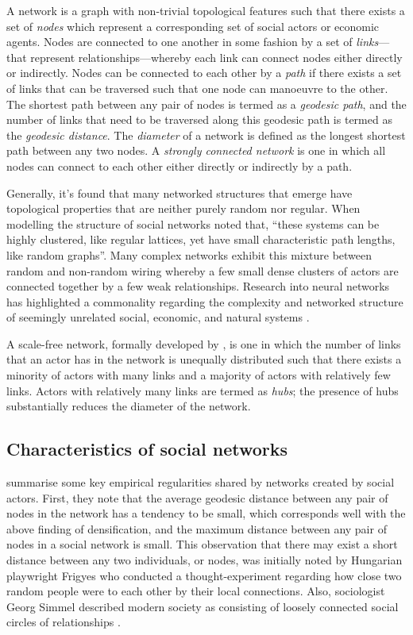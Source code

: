 A network is a graph with non-trivial topological features such that there exists a set of \emph{nodes} which represent a corresponding set of social actors or economic agents. Nodes are connected to one another in some fashion by a set of \emph{links}---that represent relationships---whereby each link can connect nodes either directly or indirectly. Nodes can be connected to each other by a \emph{path} if there exists a set of links that can be traversed such that one node can manoeuvre to the other. The shortest path between any pair of nodes is termed as a \emph{geodesic path}, and the number of links that need to be traversed along this geodesic path is termed as the \emph{geodesic distance}. The \emph{diameter} of a network is defined as the longest shortest path between any two nodes. A \emph{strongly connected network} is one in which all nodes can connect to each other either directly or indirectly by a path.

Generally, it's found that many networked structures that emerge have topological properties that are neither purely random nor regular. When modelling the structure of social networks \citet[p.~440]{WattsStrogatz1998} noted that, ``these systems can be highly clustered, like regular lattices, yet have small characteristic path lengths, like random graphs''. Many complex networks exhibit this mixture between random and non-random wiring whereby a few small dense clusters of actors are connected together by a few weak relationships. Research into neural networks has highlighted a commonality regarding the complexity and networked structure of seemingly unrelated social, economic, and natural systems \citep{SpornsTononi2005, Sporns2010}.

A scale-free network, formally developed by \citet{BarabasiAlbert1999}, is one in which the number of links that an actor has in the network is unequally distributed such that there exists a minority of actors with many links and a majority of actors with relatively few links. Actors with relatively many links are termed as \emph{hubs}; the presence of hubs substantially reduces the diameter of the network.

\subsection{Characteristics of social networks}

\citet{JacksonRogers2007} summarise some key empirical regularities shared by networks created by social actors. First, they note that the average geodesic distance between any pair of nodes in the network has a tendency to be small, which corresponds well with the above finding of densification, and the maximum distance between any pair of nodes in a social network is small. This observation that there may exist a short distance between any two individuals, or nodes, was initially noted by Hungarian playwright Frigyes \citet{Karinthy1929} who conducted a thought-experiment regarding how close two random people were to each other by their local connections. Also, sociologist Georg Simmel described modern society as consisting of loosely connected social circles of relationships \citep{Simmel1950}.

